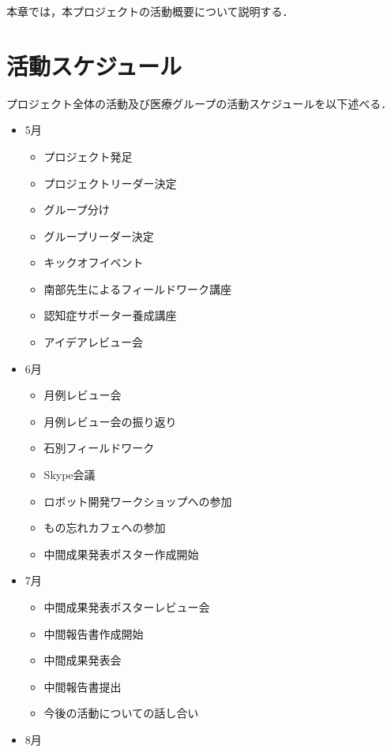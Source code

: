 \documentclass[../report]{subfiles}
\begin{document}
本章では，本プロジェクトの活動概要について説明する．


\section{活動スケジュール}
プロジェクト全体の活動及び医療グループの活動スケジュールを以下述べる．

\begin{itemize}
    \item[] 5月
    \begin{itemize}
        \item プロジェクト発足
        \item プロジェクトリーダー決定
        \item グループ分け
        \item グループリーダー決定
        \item キックオフイベント
        \item 南部先生によるフィールドワーク講座
        \item 認知症サポーター養成講座
        \item アイデアレビュー会
    \end{itemize}
    \item[] 6月
    \begin{itemize}
        \item 月例レビュー会
        \item 月例レビュー会の振り返り
        \item 石別フィールドワーク
        \item Skype会議
        \item ロボット開発ワークショップへの参加
        \item もの忘れカフェへの参加
        \item 中間成果発表ポスター作成開始
    \end{itemize}
    \item[] 7月
    \begin{itemize}
        \item 中間成果発表ポスターレビュー会
        \item 中間報告書作成開始
        \item 中間成果発表会
        \item 中間報告書提出
        \item 今後の活動についての話し合い
    \end{itemize}
    \item[] 8月
    \begin{itemize}

\end{itemize}
\end{itemize}
\end{document}
